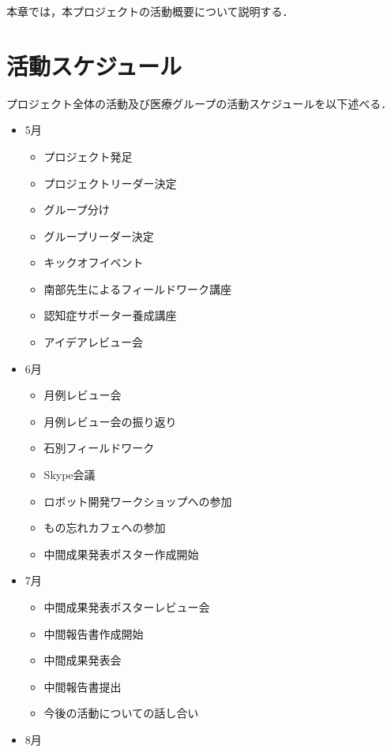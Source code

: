 \documentclass[../report]{subfiles}
\begin{document}
本章では，本プロジェクトの活動概要について説明する．


\section{活動スケジュール}
プロジェクト全体の活動及び医療グループの活動スケジュールを以下述べる．

\begin{itemize}
    \item[] 5月
    \begin{itemize}
        \item プロジェクト発足
        \item プロジェクトリーダー決定
        \item グループ分け
        \item グループリーダー決定
        \item キックオフイベント
        \item 南部先生によるフィールドワーク講座
        \item 認知症サポーター養成講座
        \item アイデアレビュー会
    \end{itemize}
    \item[] 6月
    \begin{itemize}
        \item 月例レビュー会
        \item 月例レビュー会の振り返り
        \item 石別フィールドワーク
        \item Skype会議
        \item ロボット開発ワークショップへの参加
        \item もの忘れカフェへの参加
        \item 中間成果発表ポスター作成開始
    \end{itemize}
    \item[] 7月
    \begin{itemize}
        \item 中間成果発表ポスターレビュー会
        \item 中間報告書作成開始
        \item 中間成果発表会
        \item 中間報告書提出
        \item 今後の活動についての話し合い
    \end{itemize}
    \item[] 8月
    \begin{itemize}

\end{itemize}
\end{itemize}
\end{document}
